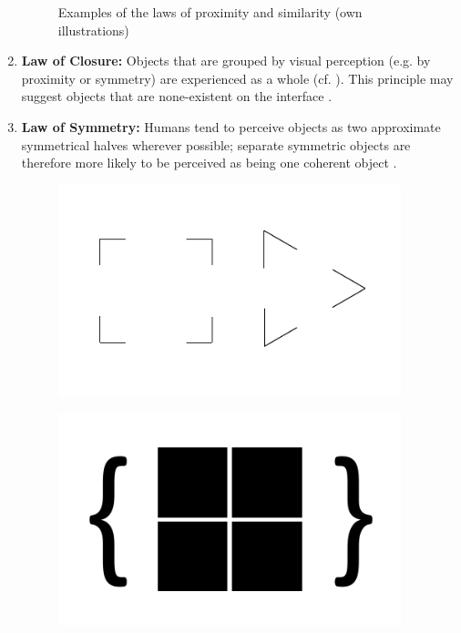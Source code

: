 \begin{enumerate}
\begin{figure}[H]
        \caption[Laws of Proximity and Similarity]{Examples of the laws of proximity and similarity (own illustrations)}\label{fig:law1}
    \end{figure}
    \item \textbf{Law of Closure:} Objects that are grouped by visual perception (e.g. by proximity or symmetry) are experienced as a whole (cf. ). This principle may suggest objects that are none-existent on the interface \parencite[cf.][]{Stevenson.n.y.}.
    \item \textbf{Law of Symmetry:} Humans tend to perceive objects as two approximate symmetrical halves wherever possible; separate symmetric objects are therefore more likely to be perceived as being one coherent object \parencite[cf.][]{Soegaard.n.y.}.
    \begin{figure}[H] 
        \begin{minipage}[b]{.5\linewidth}
            \centering\includegraphics[width=0.94\textwidth]{img/closure.pdf}
            \label{fig:clo}
        \end{minipage}%
        \begin{minipage}[b]{.5\linewidth}
            \centering\includegraphics[width=0.94\textwidth]{img/symmetry.pdf}

\end{minipage}
\end{figure}
\end{enumerate}
